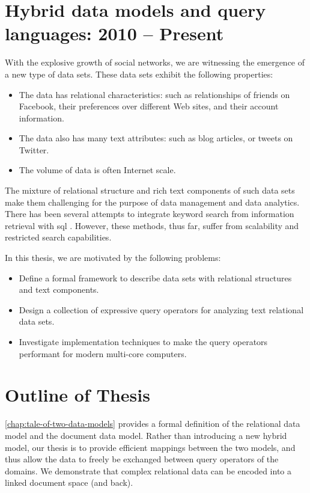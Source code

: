 	\section{Hybrid data models and query languages: 2010 -- Present}
		With the explosive growth of social networks, we are witnessing the emergence of a new type of data sets.  These data sets exhibit the following properties:
		
		\begin{itemize}
			\item The data has relational characteristics: such as relationships of friends on Facebook, their preferences over different Web sites, and their account information.
			\item The data also has many text attributes: such as blog articles, or tweets on Twitter.
			\item The volume of data is often Internet scale.
		\end{itemize}
		
		The mixture of relational structure and rich text components of such data sets make them challenging for the purpose of data management and data analytics.  There has been several attempts to integrate keyword search from information retrieval with \gls{sql} \cite{banks-02, fuzzy-11, ir-03}.  However, these methods, thus far, suffer from scalability and restricted search capabilities.
		
		In this thesis, we are motivated by the following problems:
		
		\begin{itemize}
			\item Define a formal framework to describe data sets with relational structures and text components.
			\item Design a collection of expressive query operators for analyzing text relational data sets.
			\item Investigate implementation techniques to make the query operators performant for modern multi-core computers.
		\end{itemize}
		
	\section{Outline of Thesis}
		\cref{chap:tale-of-two-data-models} provides a formal definition of the relational data model and the document data model.  Rather than introducing a new hybrid model, our thesis is to provide efficient mappings between the two models, and thus allow the data to freely be exchanged between query operators of the domains.  We demonstrate that complex relational data can be encoded into a linked document space (and back).
		
